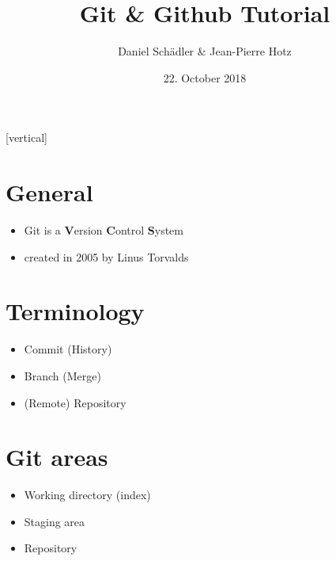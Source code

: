 \documentclass{beamer}
\begin{document}
	\title{Git \& Github Tutorial}   
	\author{Daniel Schädler \& Jean-Pierre Hotz} 
	\date{22. October 2018}
	
	\subtitle{} %
	\subject{Software-Engineering}%
	\keywords{}%
	
	[vertical]
	
	\begin{frame}
		\titlepage
	\end{frame}
	
	\begin{frame}
		\tableofcontents
	\end{frame}

	\section{General}
	\begin{frame}
		\begin{itemize}
			\item Git is a \textbf{V}ersion \textbf{C}ontrol \textbf{S}ystem \pause
			\item created in 2005 by Linus Torvalds
		\end{itemize}
	\end{frame}

	\section{Terminology}
	\begin{frame}
		\begin{itemize}
			\item Commit (History) \pause
			\item Branch (Merge) \pause
			\item (Remote) Repository
		\end{itemize}
	\end{frame}

	\section{Git areas}
	\begin{frame}
		\begin{itemize}
			\item Working directory (index) \pause
			\item Staging area \pause
			\item Repository
		\end{itemize}
	\end{frame}
\end{document}
